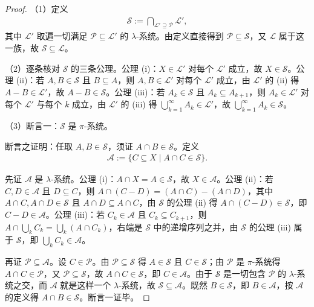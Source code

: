 \documentclass[../../main.tex]{subfiles}
\begin{document}
\begin{proof}
（1）定义
\begin{align*}
\mathcal{S}:=\bigcap_{\mathcal{L}'\supseteq\mathcal{P}}\mathcal{L}',
\end{align*}
其中 $\mathcal{L}'$ 取遍一切满足 $\mathcal{P}\subseteq\mathcal{L}'$ 的 $\lambda$-系统。由定义直接得到 $\mathcal{P}\subseteq\mathcal{S}$，又 $\mathcal{L}$ 属于这一族，故 $\mathcal{S}\subseteq\mathcal{L}$。

（2）逐条核对 $\mathcal{S}$ 的三条公理。公理 (i)：$X\in\mathcal{L}'$ 对每个 $\mathcal{L}'$ 成立，故 $X\in\mathcal{S}$。公理 (ii)：若 $A,B\in\mathcal{S}$ 且 $B\subseteq A$，则 $A,B\in\mathcal{L}'$ 对每个 $\mathcal{L}'$ 成立，由 $\mathcal{L}'$ 的 (ii) 得 $A-B\in\mathcal{L}'$，故 $A-B\in\mathcal{S}$。公理 (iii)：若 $A_{k}\in\mathcal{S}$ 且 $A_{k}\subseteq A_{k+1}$，则 $A_{k}\in\mathcal{L}'$ 对每个 $\mathcal{L}'$ 与每个 $k$ 成立，由 $\mathcal{L}'$ 的 (iii) 得 $\bigcup_{k=1}^{\infty}A_{k}\in\mathcal{L}'$，故 $\bigcup_{k=1}^{\infty}A_{k}\in\mathcal{S}$。

（3）断言一：$\mathcal{S}$ 是 $\pi$-系统。

断言之证明：任取 $A,B\in\mathcal{S}$，须证 $A\cap B\in\mathcal{S}$。定义
\begin{align*}
\mathcal{A}:=\{C\subseteq X\mid A\cap C\in\mathcal{S}\}.
\end{align*}

先证 $\mathcal{A}$ 是 $\lambda$-系统。公理 (i)：$A\cap X=A\in\mathcal{S}$，故 $X\in\mathcal{A}$。公理 (ii)：若 $C,D\in\mathcal{A}$ 且 $D\subseteq C$，则 $A\cap(C-D)=(A\cap C)-(A\cap D)$，其中 $A\cap C,A\cap D\in\mathcal{S}$ 且 $A\cap D\subseteq A\cap C$，由 $\mathcal{S}$ 的公理 (ii) 得 $A\cap(C-D)\in\mathcal{S}$，即 $C-D\in\mathcal{A}$。公理 (iii)：若 $C_{k}\in\mathcal{A}$ 且 $C_{k}\subseteq C_{k+1}$，则 $A\cap\bigcup_{k}C_{k}=\bigcup_{k}(A\cap C_{k})$，右端是 $\mathcal{S}$ 中的递增序列之并，由 $\mathcal{S}$ 的公理 (iii) 属于 $\mathcal{S}$，即 $\bigcup_{k}C_{k}\in\mathcal{A}$。

再证 $\mathcal{P}\subseteq\mathcal{A}$。设 $C\in\mathcal{P}$。由 $\mathcal{P}\subseteq\mathcal{S}$ 得 $A\in\mathcal{S}$ 且 $C\in\mathcal{S}$；由 $\mathcal{P}$ 是 $\pi$-系统得 $A\cap C\in\mathcal{P}$，又 $\mathcal{P}\subseteq\mathcal{S}$，故 $A\cap C\in\mathcal{S}$，即 $C\in\mathcal{A}$。由于 $\mathcal{S}$ 是一切包含 $\mathcal{P}$ 的 $\lambda$-系统之交，而 $\mathcal{A}$ 就是这样一个 $\lambda$-系统，故 $\mathcal{S}\subseteq\mathcal{A}$。既然 $B\in\mathcal{S}$，即 $B\in\mathcal{A}$，按 $\mathcal{A}$ 的定义得 $A\cap B\in\mathcal{S}$。断言一证毕。


\end{proof}
\end{document}
